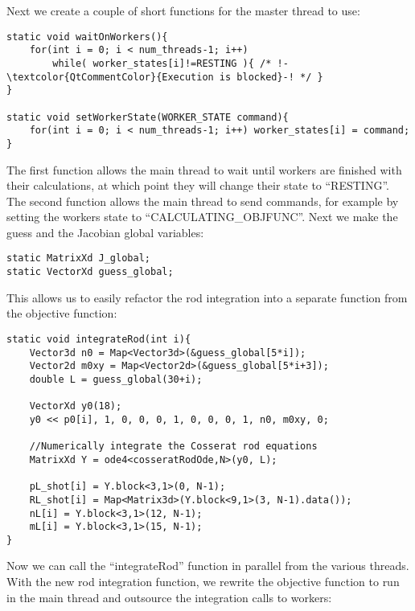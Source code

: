 \documentclass[12pt]{article}
\begin{document}
Next we create a couple of short functions for the master thread to use:
\begin{lstlisting}
static void waitOnWorkers(){
    for(int i = 0; i < num_threads-1; i++)
        while( worker_states[i]!=RESTING ){ /* !-\textcolor{QtCommentColor}{Execution is blocked}-! */ }
}

static void setWorkerState(WORKER_STATE command){
    for(int i = 0; i < num_threads-1; i++) worker_states[i] = command;
}
\end{lstlisting}
The first function allows the main thread to wait until workers are finished with their calculations, at which point they will change their state to ``RESTING''. The second function allows the main thread to send commands, for example by setting the workers state to ``CALCULATING\_OBJFUNC''.
Next we make the guess and the Jacobian global variables:
\begin{lstlisting}
static MatrixXd J_global;
static VectorXd guess_global;
\end{lstlisting}
This allows us to easily refactor the rod integration into a separate function from the objective function:
\begin{lstlisting}
static void integrateRod(int i){
    Vector3d n0 = Map<Vector3d>(&guess_global[5*i]);
    Vector2d m0xy = Map<Vector2d>(&guess_global[5*i+3]);
    double L = guess_global(30+i);

    VectorXd y0(18);
    y0 << p0[i], 1, 0, 0, 0, 1, 0, 0, 0, 1, n0, m0xy, 0;

    //Numerically integrate the Cosserat rod equations
    MatrixXd Y = ode4<cosseratRodOde,N>(y0, L);

    pL_shot[i] = Y.block<3,1>(0, N-1);
    RL_shot[i] = Map<Matrix3d>(Y.block<9,1>(3, N-1).data());
    nL[i] = Y.block<3,1>(12, N-1);
    mL[i] = Y.block<3,1>(15, N-1);
}
\end{lstlisting}
Now we can call the ``integrateRod'' function in parallel from the various threads.
\newpage \noindent
With the new rod integration function, we rewrite the objective function to run in the main thread and outsource the integration calls to workers:
\end{document}
